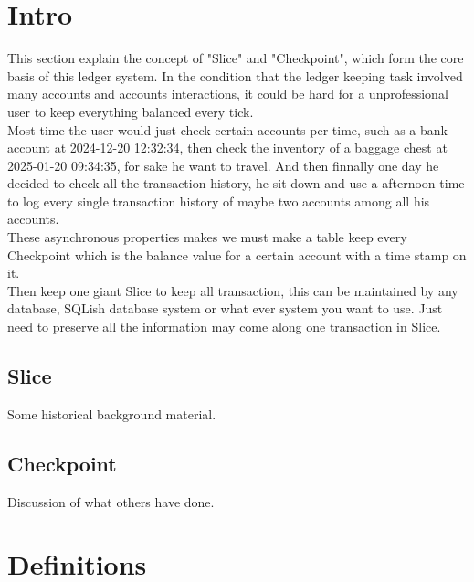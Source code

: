 



\section{Intro}
This section explain the concept of "Slice" and "Checkpoint",
which form the core basis of this ledger system.
In the condition that the ledger keeping task involved many
accounts and accounts interactions, it could be hard for a
unprofessional user to keep everything balanced every tick.\\
Most time the user would just check certain accounts per time,
such as a bank account at 2024-12-20 12:32:34, then check the inventory
of a baggage chest at 2025-01-20 09:34:35, for sake he want to travel.
And then finnally one day he decided to check all the transaction history,
he sit down and use a afternoon time to log every single transaction history
of maybe two accounts among all his accounts. \\
These asynchronous properties makes we must make a table keep every
Checkpoint which is the balance value for a certain account with a time
stamp on it.\\
Then keep one giant Slice to keep all transaction, this can be
maintained by any database, SQLish database system or what ever
system you want to use. Just need to preserve all the information may
come along one transaction in Slice.


\subsection{Slice}
Some historical background material.


\subsection{Checkpoint}
Discussion of what others have done.




\section{Definitions}


